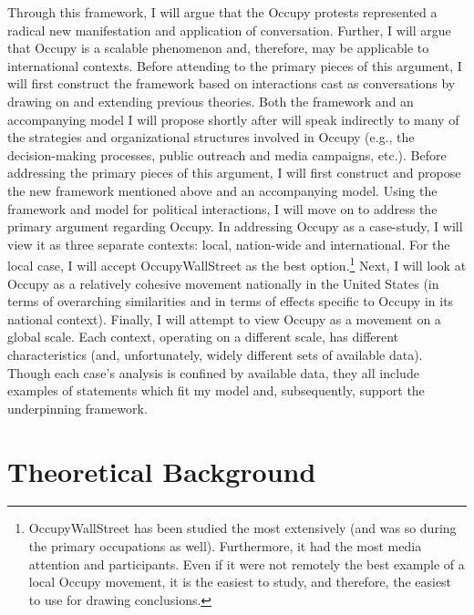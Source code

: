 \documentclass[openany,twoside]{memoir}
\begin{document}
\begin{Spacing}{2}
Through this framework, I will argue that the Occupy protests represented a radical new manifestation and application of conversation.
Further, I will argue that Occupy is a scalable phenomenon and, therefore, may be applicable to international contexts. 
Before attending to the primary pieces of this argument, I will first construct the framework based on interactions cast as conversations by drawing on and extending previous theories.
Both the framework and an accompanying model I will propose shortly after will speak indirectly to many of the strategies and organizational structures involved in Occupy (e.g., the decision-making processes, public outreach and media campaigns, etc.).
Before addressing the primary pieces of this argument, I will first construct and propose the new framework mentioned above and an accompanying model.
Using the framework and model for political interactions, I will move on to address the primary argument regarding Occupy.
In addressing Occupy as a case-study, I will view it as three separate contexts: local, nation-wide and international.
For the local case, I will accept OccupyWallStreet as the best option.\footnote{
OccupyWallStreet has been studied the most extensively (and was so during the primary occupations as well).
Furthermore, it had the most media attention and participants.
Even if it were not remotely the best example of a local Occupy movement, it is the easiest to study, and therefore, the easiest to use for drawing conclusions.}
Next, I will look at Occupy as a relatively cohesive movement nationally in the United States (in terms of overarching similarities and in terms of effects specific to Occupy in its national context).
Finally, I will attempt to view Occupy as a movement on a global scale.
Each context, operating on a different scale, has different characteristics (and, unfortunately, widely different sets of available data).
Though each case's analysis is confined by available data, they all include examples of statements which fit my model and, subsequently, support the underpinning framework.

\chapter{Theoretical Background}
\thispagestyle{fancy}

\end{Spacing}
\end{document}
